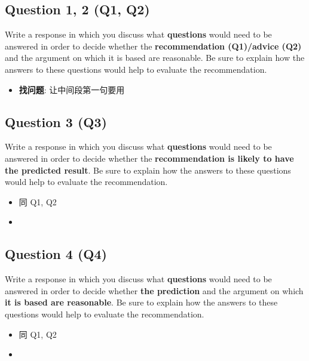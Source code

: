   \subsection{Question 1, 2 (Q1, Q2)}

    Write a response in which you discuss what \textbf{questions} would need to
    be answered in order to decide whether the
    \textbf{recommendation (Q1)/advice (Q2)} and the argument on which it is
    based are reasonable. Be sure to explain how the answers to these questions
    would help to evaluate the recommendation.

    \begin{itemize}
      \item \textbf{找问题}: 让中间段第一句要用
    \end{itemize}

  \subsection{Question 3 (Q3)}

    Write a response in which you discuss what \textbf{questions} would need
    to be answered in order to decide whether the
    \textbf{recommendation is likely to have the predicted result}. Be sure
    to explain how the answers to these questions would help to evaluate the
    recommendation.

    \begin{itemize}
      \item 同 Q1, Q2
      \item {}
    \end{itemize}

  \subsection{Question 4 (Q4)}

    Write a response in which you discuss what \textbf{questions} would need
    to be answered in order to decide whether \textbf{the prediction} and
    the argument on which \textbf{it is based are reasonable}.
    Be sure to explain how the answers to these questions would help to
    evaluate the recommendation.

    \begin{itemize}
      \item 同 Q1, Q2
      \item {}
    \end{itemize}

